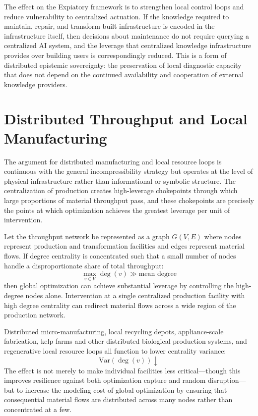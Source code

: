 \documentclass[12pt]{article}
\begin{document}
The effect on the Expiatory framework is to strengthen local control loops and reduce vulnerability to centralized actuation. If the knowledge required to maintain, repair, and transform built infrastructure is encoded in the infrastructure itself, then decisions about maintenance do not require querying a centralized AI system, and the leverage that centralized knowledge infrastructure provides over building users is correspondingly reduced. This is a form of distributed epistemic sovereignty: the preservation of local diagnostic capacity that does not depend on the continued availability and cooperation of external knowledge providers.

\section{Distributed Throughput and Local Manufacturing}

The argument for distributed manufacturing and local resource loops is continuous with the general incompressibility strategy but operates at the level of physical infrastructure rather than informational or symbolic structure. The centralization of production creates high-leverage chokepoints through which large proportions of material throughput pass, and these chokepoints are precisely the points at which optimization achieves the greatest leverage per unit of intervention.

Let the throughput network be represented as a graph $G(V, E)$ where nodes represent production and transformation facilities and edges represent material flows. If degree centrality is concentrated such that a small number of nodes handle a disproportionate share of total throughput:
\[
\max_{v \in V} \deg(v) \gg \text{mean degree}
\]
then global optimization can achieve substantial leverage by controlling the high-degree nodes alone. Intervention at a single centralized production facility with high degree centrality can redirect material flows across a wide region of the production network.

Distributed micro-manufacturing, local recycling depots, appliance-scale fabrication, kelp farms and other distributed biological production systems, and regenerative local resource loops all function to lower centrality variance:
\[
\text{Var}(\deg(v)) \downarrow
\]
The effect is not merely to make individual facilities less critical---though this improves resilience against both optimization capture and random disruption---but to increase the modeling cost of global optimization by ensuring that consequential material flows are distributed across many nodes rather than concentrated at a few.
\end{document}
